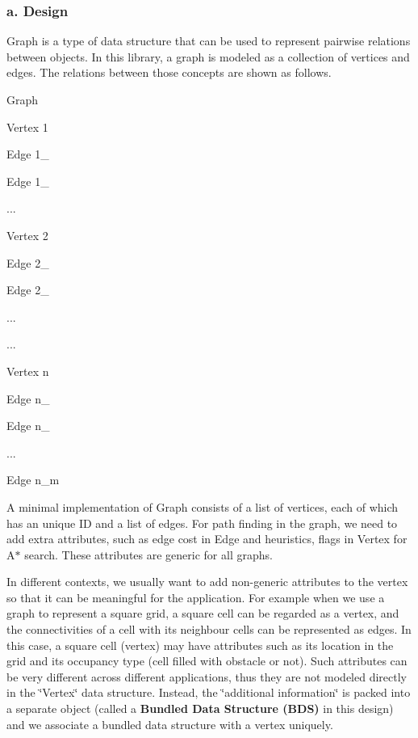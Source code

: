 \subsubsection*{a. Design}

Graph is a type of data structure that can be used to represent pairwise relations between objects. In this library, a graph is modeled as a collection of vertices and edges. The relations between those concepts are shown as follows.
\begin{DoxyItemize}
\item Graph
\begin{DoxyItemize}
\item Vertex 1
\begin{DoxyItemize}
\item Edge 1\-\_
\item Edge 1\-\_
\item ...
\end{DoxyItemize}
\item Vertex 2
\begin{DoxyItemize}
\item Edge 2\-\_
\item Edge 2\-\_
\item ...
\end{DoxyItemize}
\item ...
\item Vertex n
\begin{DoxyItemize}
\item Edge n\-\_
\item Edge n\-\_
\item ...
\item Edge n\-\_\-m
\end{DoxyItemize}
\end{DoxyItemize}
\end{DoxyItemize}

A minimal implementation of Graph consists of a list of vertices, each of which has an unique I\-D and a list of edges. For path finding in the graph, we need to add extra attributes, such as edge cost in Edge and heuristics, flags in Vertex for A$\ast$ search. These attributes are generic for all graphs.

In different contexts, we usually want to add non-\/generic attributes to the vertex so that it can be meaningful for the application. For example when we use a graph to represent a square grid, a square cell can be regarded as a vertex, and the connectivities of a cell with its neighbour cells can be represented as edges. In this case, a square cell (vertex) may have attributes such as its location in the grid and its occupancy type (cell filled with obstacle or not). Such attributes can be very different across different applications, thus they are not modeled directly in the \char`\"{}\-Vertex\char`\"{} data structure. Instead, the \char`\"{}additional information\char`\"{} is packed into a separate object (called a {\bfseries Bundled Data Structure (B\-D\-S)} in this design) and we associate a bundled data structure with a vertex uniquely.

